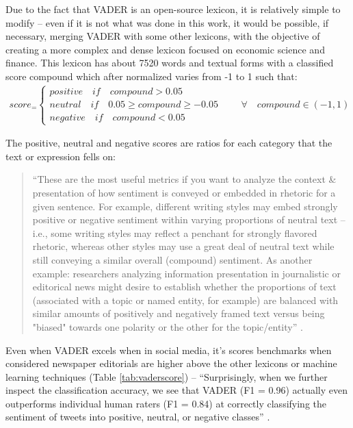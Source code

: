 Due to the fact that VADER is an open-source lexicon, it is relatively simple to modify -- even if it is not what was done in this work, it would be possible, if necessary, merging VADER with some other lexicons, with the objective of creating a more complex and dense lexicon focused on economic science and finance. This lexicon has about 7520 words and textual forms with a classified score compound which after normalized varies from -1 to 1 such that:
\begin{align} \label{eq:vaadercoumpond}
    score_ = \begin{cases}
                positive\quad if \quad compound > 0.05\\
                neutral\quad if \quad 0.05 \geq compound \geq -0.05\\
                negative\quad if \quad compound < 0.05
              \end{cases} \qquad \forall\quad compound \in (-1, 1)
\end{align}

The positive, neutral and negative scores are ratios for each category that the text or expression fells on: 
\begin{quote}
    ``These are the most useful metrics if you want to analyze the context \& presentation of how sentiment is conveyed or embedded in rhetoric for a given sentence. For example, different writing styles may embed strongly positive or negative sentiment within varying proportions of neutral text -- i.e., some writing styles may reflect a penchant for strongly flavored rhetoric, whereas other styles may use a great deal of neutral text while still conveying a similar overall (compound) sentiment. As another example: researchers analyzing information presentation in journalistic or editorical news might desire to establish whether the proportions of text (associated with a topic or named entity, for example) are balanced with similar amounts of positively and negatively framed text versus being "biased" towards one polarity or the other for the topic/entity'' \cite{vadergit}.
\end{quote}

Even when VADER excels when in social media, it's scores benchmarks when considered newspaper editorials are higher above the other lexicons or machine learning techniques (Table \ref{tab:vaderscore}) -- ``Surprisingly, when we further inspect the classification accuracy, we see that VADER (F1 = 0.96) actually even outperforms individual human raters (F1 = 0.84) at correctly classifying the sentiment of tweets into positive, neutral, or negative classes'' \citep[p.216]{hutto2014vader}.

